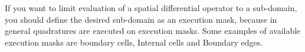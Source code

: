 \documentclass[emamy.tex]{subfiles}
\begin{document}
If you want to limit evaluation of a spatial differential operator to a sub-domain, you should define the desired sub-domain as an execution mask, because in general quadratures are executed on execution masks. Some examples of available execution masks are boundary cells, Internal cells and Boundary edges.
\end{document}
